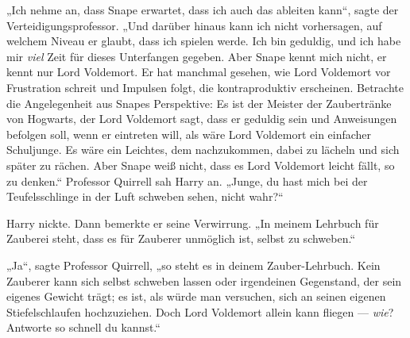 „Ich nehme an, dass Snape erwartet, dass ich auch das ableiten kann“, sagte der Verteidigungsprofessor.
„Und darüber hinaus kann ich nicht vorhersagen, auf welchem Niveau er glaubt, dass ich spielen werde. Ich bin geduldig, und ich habe mir \emph{viel} Zeit für dieses Unterfangen gegeben. Aber Snape kennt mich nicht, er kennt nur Lord Voldemort. Er hat manchmal gesehen, wie Lord Voldemort vor Frustration schreit und Impulsen folgt, die kontraproduktiv erscheinen. Betrachte die Angelegenheit aus Snapes Perspektive: Es ist der Meister der Zaubertränke von Hogwarts, der Lord Voldemort sagt, dass er geduldig sein und Anweisungen befolgen soll, wenn er eintreten will, als wäre Lord Voldemort ein einfacher Schuljunge. Es wäre ein Leichtes, dem nachzukommen, dabei zu lächeln und sich später zu rächen. Aber Snape weiß nicht, dass es Lord Voldemort leicht fällt, so zu denken.“
Professor Quirrell sah Harry an.
„Junge, du hast mich bei der Teufelsschlinge in der Luft schweben sehen, nicht wahr?“

Harry nickte. Dann bemerkte er seine Verwirrung.
„In meinem Lehrbuch für Zauberei steht, dass es für Zauberer unmöglich ist, selbst zu schweben.“

„Ja“, sagte Professor Quirrell, „so steht es in deinem Zauber-Lehrbuch. Kein Zauberer kann sich selbst schweben lassen oder irgendeinen Gegenstand, der sein eigenes Gewicht trägt; es ist, als würde man versuchen, sich an seinen eigenen Stiefelschlaufen hochzuziehen. Doch Lord Voldemort allein kann fliegen — \emph{wie}? Antworte so schnell du kannst.“

